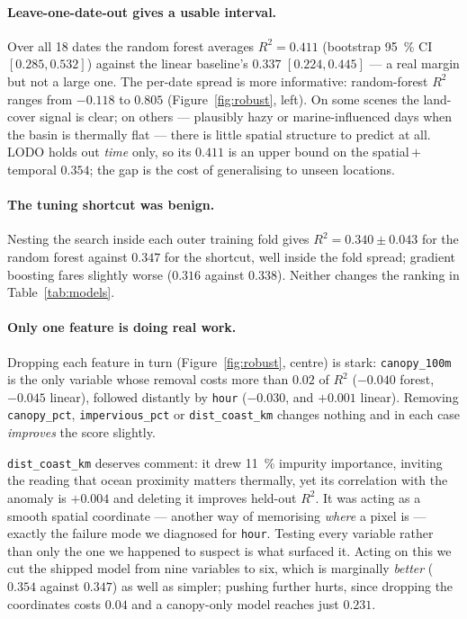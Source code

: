 \documentclass[10pt]{article}   %
\begin{document}
\paragraph{Leave-one-date-out gives a usable interval.}
Over all 18 dates the random forest averages $R^2 = 0.411$ (bootstrap \SI{95}{\percent} CI
$[0.285, 0.532]$) against the linear baseline's $0.337$ $[0.224, 0.445]$ --- a real margin
but not a large one. The per-date spread is more informative: random-forest $R^2$ ranges
from $-0.118$ to $0.805$ (Figure~\ref{fig:robust}, left). On some scenes the land-cover
signal is clear; on others --- plausibly hazy or marine-influenced days when the basin is
thermally flat --- there is little spatial structure to predict at all. LODO holds out
\emph{time} only, so its $0.411$ is an upper bound on the spatial\,$+$\,temporal $0.354$;
the gap is the cost of generalising to unseen locations.

\paragraph{The tuning shortcut was benign.}
Nesting the search inside each outer training fold gives $R^2 = 0.340 \pm 0.043$ for the
random forest against $0.347$ for the shortcut, well inside the fold spread; gradient
boosting fares slightly worse ($0.316$ against $0.338$). Neither changes the ranking in
Table~\ref{tab:models}.

\paragraph{Only one feature is doing real work.}
Dropping each feature in turn (Figure~\ref{fig:robust}, centre) is stark:
\texttt{canopy\_100m} is the only variable whose removal costs more than $0.02$ of $R^2$
($-0.040$ forest, $-0.045$ linear), followed distantly by \texttt{hour} ($-0.030$, and
$+0.001$ linear). Removing \texttt{canopy\_pct}, \texttt{impervious\_pct} or
\texttt{dist\_coast\_km} changes nothing and in each case \emph{improves} the score slightly.

\texttt{dist\_coast\_km} deserves comment: it drew \SI{11}{\percent} impurity importance,
inviting the reading that ocean proximity matters thermally, yet its correlation with the
anomaly is $+0.004$ and deleting it improves held-out $R^2$. It was acting as a smooth
spatial coordinate --- another way of memorising \emph{where} a pixel is --- exactly the
failure mode we diagnosed for \texttt{hour}. Testing every variable rather than only the one
we happened to suspect is what surfaced it. Acting on this we cut the shipped model from
nine variables to six, which is marginally \emph{better} ($0.354$ against $0.347$) as well
as simpler; pushing further hurts, since dropping the coordinates costs $0.04$ and a
canopy-only model reaches just $0.231$.
\end{document}
